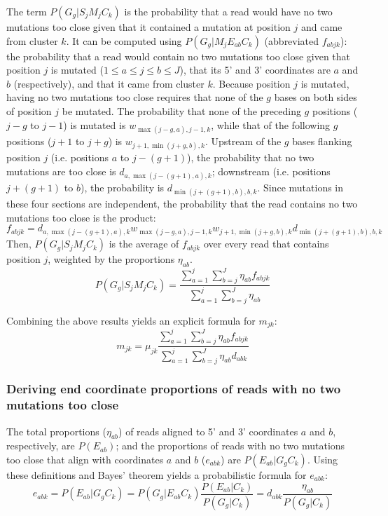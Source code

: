 \documentclass{article}
\begin{document}
The term $P(G_g | S_j M_j C_k)$ is the probability that a read would have no two mutations too close given that it contained a mutation at position $j$ and came from cluster $k$.
It can be computed using $P(G_g | M_j E_{ab} C_k)$ (abbreviated $f_{abjk}$): the probability that a read would contain no two mutations too close given that position $j$ is mutated ($1 \le a \le j \le b \le J$), that its 5' and 3' coordinates are $a$ and $b$ (respectively), and that it came from cluster $k$.
Because position $j$ is mutated, having no two mutations too close requires that none of the $g$ bases on both sides of position $j$ be mutated.
The probability that none of the preceding $g$ positions ($j - g$ to $j - 1$) is mutated is $w_{\max(j-g,a),j-1,k}$, while that of the following $g$ positions ($j + 1$ to $j + g$) is $w_{j+1,\min(j+g,b),k}$.
Upstream of the $g$ bases flanking position $j$ (i.e. positions $a$ to $j - (g + 1)$), the probability that no two mutations are too close is $d_{a,\max(j-(g+1),a),k}$; downstream (i.e. positions $j + (g + 1)$ to $b$), the probability is $d_{\min(j+(g+1),b),b,k}$.
Since mutations in these four sections are independent, the probability that the read contains no two mutations too close is the product:
\begin{equation}
    f_{abjk} = d_{a,\max(j-(g+1),a),k} w_{\max(j-g,a),j-1,k} w_{j+1,\min(j+g,b),k} d_{\min(j+(g+1),b),b,k}
\end{equation}
Then, $P(G_g | S_j M_j C_k)$ is the average of $f_{abjk}$ over every read that contains position $j$, weighted by the proportions $\eta_{ab}$.
\begin{equation}
    P(G_g | S_j M_j C_k) = \frac{\sum_{a=1}^{j}\sum_{b=j}^{J}\eta_{ab} f_{abjk}}{\sum_{a=1}^{j}\sum_{b=j}^{J}\eta_{ab}}
\end{equation}

Combining the above results yields an explicit formula for $m_{jk}$:
\begin{equation}
    m_{jk} = \mu_{jk} \frac{\sum_{a=1}^{j}\sum_{b=j}^{J}\eta_{ab} f_{abjk}}{\sum_{a=1}^{j}\sum_{b=j}^{J}\eta_{ab}d_{abk}}
\end{equation}

\subsubsection{Deriving end coordinate proportions of reads with no two mutations too close}
\label{calc_p_ends_noclose}

The total proportions ($\eta_{ab}$) of reads aligned to 5' and 3' coordinates $a$ and $b$, respectively, are $P(E_{ab})$; and the proportions of reads with no two mutations too close that align with coordinates $a$ and $b$ ($e_{abk}$) are $P(E_{ab} | G_g C_k)$.
Using these definitions and Bayes' theorem yields a probabilistic formula for $e_{abk}$:
\begin{equation}
    e_{abk} = P(E_{ab} | G_g C_k) = P(G_g | E_{ab} C_k) \frac{P(E_{ab} | C_k)}{P(G_g | C_k)} = d_{abk} \frac{\eta_{ab}}{P(G_g | C_k)}
\end{equation}
\end{document}
